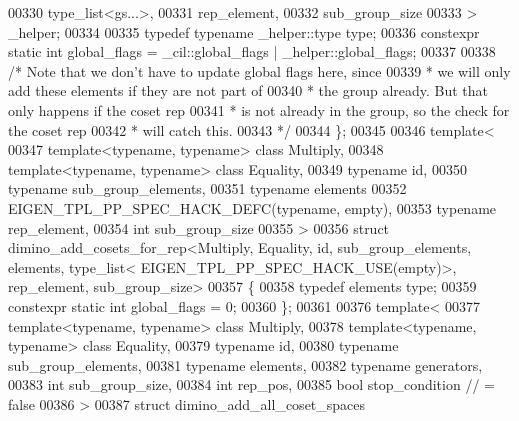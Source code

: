 \begin{DoxyCode}
00330     type\_list<gs...>,
00331     rep\_element,
00332     sub\_group\_size
00333   > \_helper;
00334 
00335   \textcolor{keyword}{typedef} \textcolor{keyword}{typename} \_helper::type type;
00336   constexpr \textcolor{keyword}{static} \textcolor{keywordtype}{int} global\_flags = \_cil::global\_flags | \_helper::global\_flags;
00337 
00338   \textcolor{comment}{/* Note that we don't have to update global flags here, since}
00339 \textcolor{comment}{   * we will only add these elements if they are not part of}
00340 \textcolor{comment}{   * the group already. But that only happens if the coset rep}
00341 \textcolor{comment}{   * is not already in the group, so the check for the coset rep}
00342 \textcolor{comment}{   * will catch this.}
00343 \textcolor{comment}{   */}
00344 \};
00345 
00346 \textcolor{keyword}{template}<
00347   \textcolor{keyword}{template}<\textcolor{keyword}{typename}, \textcolor{keyword}{typename}> \textcolor{keyword}{class }Multiply,
00348   \textcolor{keyword}{template}<\textcolor{keyword}{typename}, \textcolor{keyword}{typename}> \textcolor{keyword}{class }Equality,
00349   \textcolor{keyword}{typename} id,
00350   \textcolor{keyword}{typename} sub\_group\_elements,
00351   \textcolor{keyword}{typename} elements
00352   EIGEN\_TPL\_PP\_SPEC\_HACK\_DEFC(\textcolor{keyword}{typename}, empty),
00353   \textcolor{keyword}{typename} rep\_element,
00354   \textcolor{keywordtype}{int} sub\_group\_size
00355 >
00356 \textcolor{keyword}{struct }dimino\_add\_cosets\_for\_rep<Multiply, Equality, id, sub\_group\_elements, elements, type\_list<
      EIGEN\_TPL\_PP\_SPEC\_HACK\_USE(empty)>, rep\_element, sub\_group\_size>
00357 \{
00358   \textcolor{keyword}{typedef} elements type;
00359   constexpr \textcolor{keyword}{static} \textcolor{keywordtype}{int} global\_flags = 0;
00360 \};
00361 
00376 \textcolor{keyword}{template}<
00377   \textcolor{keyword}{template}<\textcolor{keyword}{typename}, \textcolor{keyword}{typename}> \textcolor{keyword}{class }Multiply,
00378   \textcolor{keyword}{template}<\textcolor{keyword}{typename}, \textcolor{keyword}{typename}> \textcolor{keyword}{class }Equality,
00379   \textcolor{keyword}{typename} id,
00380   \textcolor{keyword}{typename} sub\_group\_elements,
00381   \textcolor{keyword}{typename} elements,
00382   \textcolor{keyword}{typename} generators,
00383   \textcolor{keywordtype}{int} sub\_group\_size,
00384   \textcolor{keywordtype}{int} rep\_pos,
00385   \textcolor{keywordtype}{bool} stop\_condition        \textcolor{comment}{// = false}
00386 >
00387 \textcolor{keyword}{struct }dimino\_add\_all\_coset\_spaces

\end{DoxyCode}
